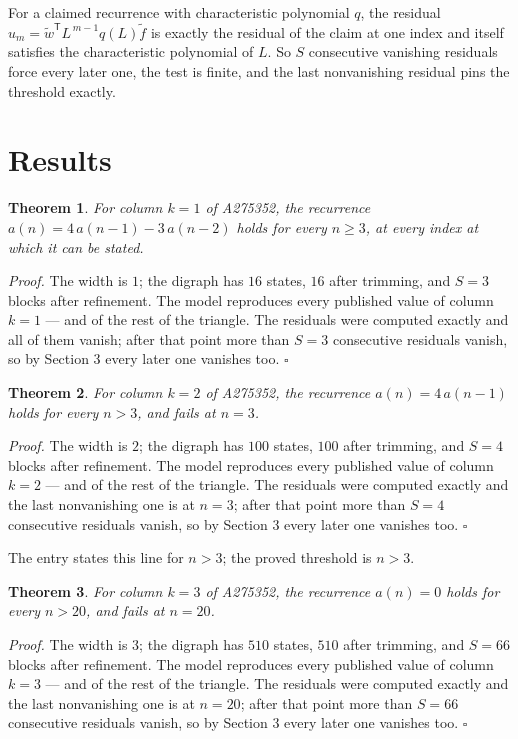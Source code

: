 \documentclass[11pt]{article}
\newtheorem{theorem}{Theorem}
\theoremstyle{definition}
\begin{document}
For a claimed recurrence with characteristic polynomial $q$, the residual $u_m = \tilde w^{\mathsf T}L^{\,m-1}q(L)\tilde f$ is exactly the residual of the claim at one index and itself satisfies the characteristic polynomial of $L$. So $S$ consecutive vanishing residuals force every later one, the test is finite, and the last nonvanishing residual pins the threshold exactly.

\section{Results}

\begin{theorem} For column $k = 1$ of A275352, the recurrence $a(n) = 4\,a(n-1) - 3\,a(n-2)$ holds for every $n \ge 3$, at every index at which it can be stated.\end{theorem}

{\itshape Proof.} The width is $1$; the digraph has $16$ states, $16$ after trimming, and $S = 3$ blocks after refinement. The model reproduces every published value of column $k = 1$ --- and of the rest of the triangle. The residuals were computed exactly and all of them vanish; after that point more than $S = 3$ consecutive residuals vanish, so by Section 3 every later one vanishes too. $\square$

\begin{theorem} For column $k = 2$ of A275352, the recurrence $a(n) = 4\,a(n-1)$ holds for every $n > 3$, and fails at $n = 3$.\end{theorem}

{\itshape Proof.} The width is $2$; the digraph has $100$ states, $100$ after trimming, and $S = 4$ blocks after refinement. The model reproduces every published value of column $k = 2$ --- and of the rest of the triangle. The residuals were computed exactly and the last nonvanishing one is at $n = 3$; after that point more than $S = 4$ consecutive residuals vanish, so by Section 3 every later one vanishes too. $\square$

The entry states this line for $n > 3$; the proved threshold is $n > 3$.

\begin{theorem} For column $k = 3$ of A275352, the recurrence $a(n) = 0$ holds for every $n > 20$, and fails at $n = 20$.\end{theorem}

{\itshape Proof.} The width is $3$; the digraph has $510$ states, $510$ after trimming, and $S = 66$ blocks after refinement. The model reproduces every published value of column $k = 3$ --- and of the rest of the triangle. The residuals were computed exactly and the last nonvanishing one is at $n = 20$; after that point more than $S = 66$ consecutive residuals vanish, so by Section 3 every later one vanishes too. $\square$
\end{document}
